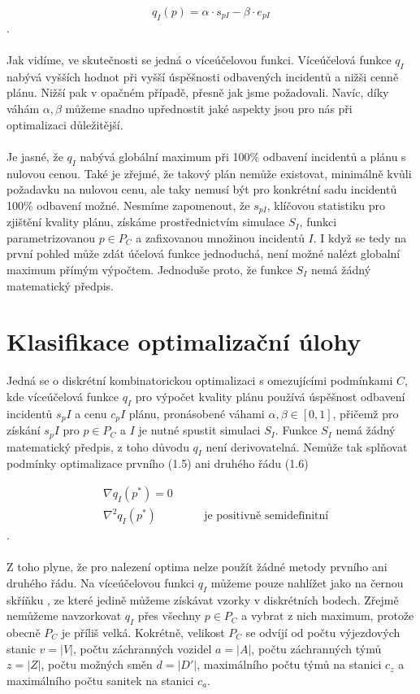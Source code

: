 $$
  q_I(p) = \alpha \cdot s_{pI} - \beta \cdot e_{pI}
$$
.
\\
\\
Jak vidíme, ve skutečnosti se jedná o víceúčelovou funkci.
Víceúčelová funkce $q_I$ nabývá vyšších hodnot při vyšší úspěšnosti odbavených incidentů a nižši cenně plánu.
Nižší pak v opačném případě, přesně jak jsme požadovali.
Navíc, díky váhám $\alpha, \beta$ můžeme snadno upřednostit jaké aspekty jsou pro nás při optimalizaci důležitější.
\\
\\
Je jasné, že $q_I$ nabývá globální maximum při 100\% odbavení incidentů a plánu s nulovou cenou.
Také je zřejmé, že takový plán nemůže existovat, minimálně kvůli požadavku na nulovou cenu, ale taky nemusí být pro konkrétní sadu incidentů 100\% odbavení možné.
Nesmíme zapomenout, že $s_{pI}$, klíčovou statistiku pro zjištění kvality plánu,
získáme prostřednictvím simulace $S_I$, funkci parametrizovanou $p \in P_C$ a zafixovanou množinou incidentů $I$.
I když se tedy na první pohled může zdát účelová funkce jednoduchá, není možné nalézt globalní maximum přímým výpočtem.
Jednoduše proto, že funkce $S_I$ nemá žádný matematický předpis.

\section{Klasifikace optimalizační úlohy}

Jedná se o diskrétní kombinatorickou optimalizaci s omezujícími podmínkami $C$, kde víceúčelová funkce $q_I$ pro výpočet kvality plánu používá úspěšnost
odbavení incidentů $s_pI$ a cenu $c_pI$ plánu, pronásobené váhami $\alpha, \beta \in [0, 1]$,
přičemž pro získání $s_pI$ pro $p \in P_C$ a $I$ je nutné spustit simulaci $S_I$.
Funkce $S_I$ nemá žádný matematický předpis, z toho důvodu $q_I$ není derivovatelná.
Nemůže tak splňovat podmínky optimalizace prvního (1.5) ani druhého řádu (1.6) %

\begin{align}
  &\nabla q_I(p^*) = 0 \\
  &\nabla^2 q_I(p^*) \hspace{50pt} \text{je positivně semidefinitní}
\end{align}
.
\\
\\
Z toho plyne, že pro nalezení optima nelze použít žádné metody prvního ani druhého řádu. %
Na víceúčelovou funkci $q_I$ můžeme pouze nahlížet jako na černou skříňku %
, ze které jedině můžeme získávat vzorky v diskrétních bodech.
Zřejmě nemůžeme navzorkovat $q_I$ přes všechny $p \in P_C$ a vybrat z nich maximum, protože obecně $P_C$ je příliš velká.
Kokrétně, velikost $P_C$ se odvíjí od počtu výjezdových stanic $v = |V|$, počtu záchranných vozidel $a = |A|$, počtu záchranných týmů $z = |Z|$, počtu možných směn $d = |D'|$, 
maximálního počtu týmů na stanici $c_z$ a maximálního počtu sanitek na stanici $c_a$.

